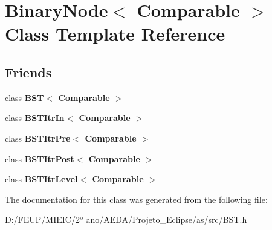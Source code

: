 \hypertarget{class_binary_node}{}\section{Binary\+Node$<$ Comparable $>$ Class Template Reference}
\label{class_binary_node}
\subsection*{Friends}
\begin{DoxyCompactItemize}
\item 
\mbox{\label{class_binary_node_a28a1adb9906f3ff7e12c2cb6fa2bd54e}} 
class {\bfseries B\+S\+T$<$ Comparable $>$}
\item 
\mbox{\label{class_binary_node_aab3993acac2ab24a0b59edb0c3acc775}} 
class {\bfseries B\+S\+T\+Itr\+In$<$ Comparable $>$}
\item 
\mbox{\label{class_binary_node_a45a55df6f11541416d4ea7684c575c1a}} 
class {\bfseries B\+S\+T\+Itr\+Pre$<$ Comparable $>$}
\item 
\mbox{\label{class_binary_node_a5dc153694be266f6e772659486219da7}} 
class {\bfseries B\+S\+T\+Itr\+Post$<$ Comparable $>$}
\item 
\mbox{\label{class_binary_node_a26ff00bc0d87069aed877f10fd3c80a8}} 
class {\bfseries B\+S\+T\+Itr\+Level$<$ Comparable $>$}
\end{DoxyCompactItemize}


The documentation for this class was generated from the following file\+:\begin{DoxyCompactItemize}
\item 
D\+:/\+F\+E\+U\+P/\+M\+I\+E\+I\+C/2º ano/\+A\+E\+D\+A/\+Projeto\+\_\+\+Eclipse/as/src/B\+S\+T.\+h\end{DoxyCompactItemize}
